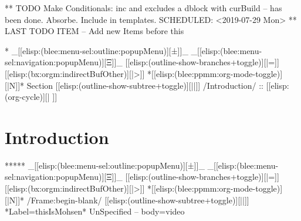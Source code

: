 \begin{whenOrg}
** TODO Make Conditionals: inc and excludes a dblock with curBuild -- has been done. Absorbe. Include in templates.
   SCHEDULED: <2019-07-29 Mon>
** LAST TODO ITEM -- Add new Items before this
\end{whenOrg}

\begin{whenOrg}
*  _[[elisp:(blee:menu-sel:outline:popupMenu)][±]]_ _[[elisp:(blee:menu-sel:navigation:popupMenu)][Ξ]]_ [[elisp:(outline-show-branches+toggle)][|=]] [[elisp:(bx:orgm:indirectBufOther)][|>]] *[[elisp:(blee:ppmm:org-mode-toggle)][|N]]*  Section    [[elisp:(outline-show-subtree+toggle)][||]]   /Introduction/ ::  [[elisp:(org-cycle)][| ]]
\end{whenOrg}

\section{Introduction}


\begin{whenOrg}
*****  _[[elisp:(blee:menu-sel:outline:popupMenu)][±]]_ _[[elisp:(blee:menu-sel:navigation:popupMenu)][Ξ]]_ [[elisp:(outline-show-branches+toggle)][|=]] [[elisp:(bx:orgm:indirectBufOther)][|>]] *[[elisp:(blee:ppmm:org-mode-toggle)][|N]]*  /Frame:begin-blank/ [[elisp:(outline-show-subtree+toggle)][||]] *Label=thisIsMohsen* UnSpecified -- body=video
\end{whenOrg}

